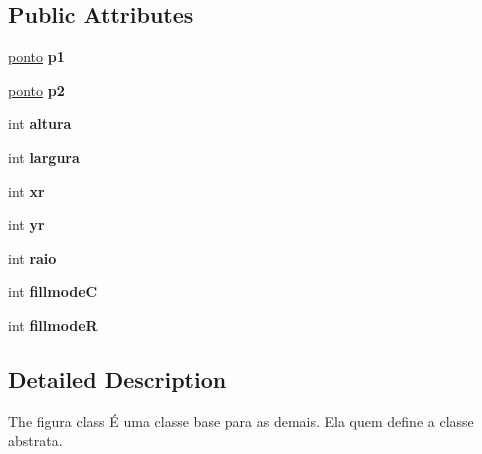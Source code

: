 \subsection*{Public Attributes}
\begin{DoxyCompactItemize}
\item 
\hyperlink{classponto}{ponto} {\bfseries p1}\hypertarget{classfigura_a9ae5341fbe21ecd3dd9f895ed9e4a78e}{}\label{classfigura_a9ae5341fbe21ecd3dd9f895ed9e4a78e}

\item 
\hyperlink{classponto}{ponto} {\bfseries p2}\hypertarget{classfigura_ab665a3b5fccd2d21575e856fcf201b5f}{}\label{classfigura_ab665a3b5fccd2d21575e856fcf201b5f}

\item 
int {\bfseries altura}\hypertarget{classfigura_a4fc32b66b8e8d705f5d5c2f57661964a}{}\label{classfigura_a4fc32b66b8e8d705f5d5c2f57661964a}

\item 
int {\bfseries largura}\hypertarget{classfigura_a5815a007e56f07b5d34e4d17e6de6a26}{}\label{classfigura_a5815a007e56f07b5d34e4d17e6de6a26}

\item 
int {\bfseries xr}\hypertarget{classfigura_a94e13245981b5c337ed7d57440336547}{}\label{classfigura_a94e13245981b5c337ed7d57440336547}

\item 
int {\bfseries yr}\hypertarget{classfigura_a6e7003ca706d3a5fdc1ce90e890f8e0e}{}\label{classfigura_a6e7003ca706d3a5fdc1ce90e890f8e0e}

\item 
int {\bfseries raio}\hypertarget{classfigura_ac35643cee4e1b10b14596844f7cbabd0}{}\label{classfigura_ac35643cee4e1b10b14596844f7cbabd0}

\item 
int {\bfseries fillmodeC}\hypertarget{classfigura_a50ed7cd56e8b5fa4bc782af88d7312c2}{}\label{classfigura_a50ed7cd56e8b5fa4bc782af88d7312c2}

\item 
int {\bfseries fillmodeR}\hypertarget{classfigura_a1e15a50e506113d3fb2fed7b49c7cc7e}{}\label{classfigura_a1e15a50e506113d3fb2fed7b49c7cc7e}

\end{DoxyCompactItemize}


\subsection{Detailed Description}
The figura class É uma classe base para as demais. Ela quem define a classe abstrata. 

